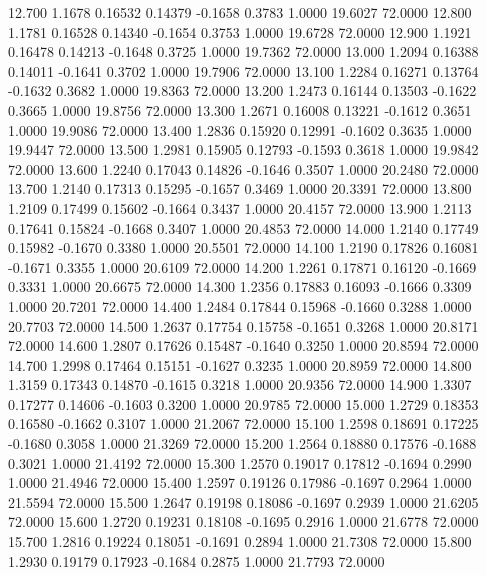   12.700   1.1678   0.16532   0.14379  -0.1658   0.3783   1.0000  19.6027  72.0000
  12.800   1.1781   0.16528   0.14340  -0.1654   0.3753   1.0000  19.6728  72.0000
  12.900   1.1921   0.16478   0.14213  -0.1648   0.3725   1.0000  19.7362  72.0000
  13.000   1.2094   0.16388   0.14011  -0.1641   0.3702   1.0000  19.7906  72.0000
  13.100   1.2284   0.16271   0.13764  -0.1632   0.3682   1.0000  19.8363  72.0000
  13.200   1.2473   0.16144   0.13503  -0.1622   0.3665   1.0000  19.8756  72.0000
  13.300   1.2671   0.16008   0.13221  -0.1612   0.3651   1.0000  19.9086  72.0000
  13.400   1.2836   0.15920   0.12991  -0.1602   0.3635   1.0000  19.9447  72.0000
  13.500   1.2981   0.15905   0.12793  -0.1593   0.3618   1.0000  19.9842  72.0000
  13.600   1.2240   0.17043   0.14826  -0.1646   0.3507   1.0000  20.2480  72.0000
  13.700   1.2140   0.17313   0.15295  -0.1657   0.3469   1.0000  20.3391  72.0000
  13.800   1.2109   0.17499   0.15602  -0.1664   0.3437   1.0000  20.4157  72.0000
  13.900   1.2113   0.17641   0.15824  -0.1668   0.3407   1.0000  20.4853  72.0000
  14.000   1.2140   0.17749   0.15982  -0.1670   0.3380   1.0000  20.5501  72.0000
  14.100   1.2190   0.17826   0.16081  -0.1671   0.3355   1.0000  20.6109  72.0000
  14.200   1.2261   0.17871   0.16120  -0.1669   0.3331   1.0000  20.6675  72.0000
  14.300   1.2356   0.17883   0.16093  -0.1666   0.3309   1.0000  20.7201  72.0000
  14.400   1.2484   0.17844   0.15968  -0.1660   0.3288   1.0000  20.7703  72.0000
  14.500   1.2637   0.17754   0.15758  -0.1651   0.3268   1.0000  20.8171  72.0000
  14.600   1.2807   0.17626   0.15487  -0.1640   0.3250   1.0000  20.8594  72.0000
  14.700   1.2998   0.17464   0.15151  -0.1627   0.3235   1.0000  20.8959  72.0000
  14.800   1.3159   0.17343   0.14870  -0.1615   0.3218   1.0000  20.9356  72.0000
  14.900   1.3307   0.17277   0.14606  -0.1603   0.3200   1.0000  20.9785  72.0000
  15.000   1.2729   0.18353   0.16580  -0.1662   0.3107   1.0000  21.2067  72.0000
  15.100   1.2598   0.18691   0.17225  -0.1680   0.3058   1.0000  21.3269  72.0000
  15.200   1.2564   0.18880   0.17576  -0.1688   0.3021   1.0000  21.4192  72.0000
  15.300   1.2570   0.19017   0.17812  -0.1694   0.2990   1.0000  21.4946  72.0000
  15.400   1.2597   0.19126   0.17986  -0.1697   0.2964   1.0000  21.5594  72.0000
  15.500   1.2647   0.19198   0.18086  -0.1697   0.2939   1.0000  21.6205  72.0000
  15.600   1.2720   0.19231   0.18108  -0.1695   0.2916   1.0000  21.6778  72.0000
  15.700   1.2816   0.19224   0.18051  -0.1691   0.2894   1.0000  21.7308  72.0000
  15.800   1.2930   0.19179   0.17923  -0.1684   0.2875   1.0000  21.7793  72.0000

